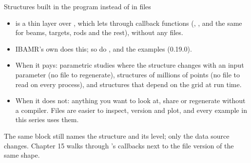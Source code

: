 \documentclass[aspectratio=169,11pt]{beamer}
\begin{document}
\begin{frame}{Structures built in the program instead of in files}
\begin{itemize}
  \item {} is a thin layer over , which lets   through callback functions (, , and the same for beams, targets, rods and the rest), without any files.
  \item IBAMR's own  does this; so do ,  and the  examples (0.19.0).
  \item When it pays: parametric studies where the structure changes with an input parameter (no file to regenerate), structures of millions of points (no file to read on every process), and structures that depend on the grid at run time.
  \item When it does not: anything you want to look at, share or regenerate without a compiler. Files are easier to inspect, version and plot, and every example in this series uses them.
\end{itemize}
\vspace{2mm}
\begin{punchbox}
\small The same  block still names the structure and its level; only the data source changes. Chapter 15 walks through 's callbacks next to the file version of the same shape.
\end{punchbox}
\end{frame}
\end{document}
